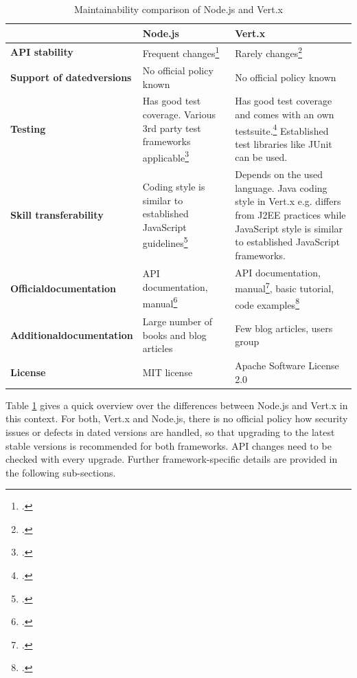 \begin{savenotes}
\begin{table}[ht]
\begin{tabular*}{\textwidth}{p{} p{} p{}}
\toprule
				& \textbf{Node.js} & \textbf{Vert.x} \\
\midrule 
\textbf{API stability}
& Frequent changes\footcite[Cf.][]{node_api_changes_2012}
& Rarely changes\footcite[Cf.][]{vertx_2012}
\\	
\textbf{Support of dated\newline versions}
& No official policy known
& No official policy known
\\
\textbf{Testing}
& Has good test coverage. Various 3rd party test frameworks applicable\footcite[Cf.][]{node_testing_2013}
& Has good test coverage and comes with an own testsuite.\footcite[Cf.][]{vertx_repository_2013} Established test libraries like JUnit can be used.
\\						  
\textbf{Skill transferability}	
& Coding style is similar to established JavaScript guidelines\footcite[Cf.][]{node_style_2012}							
& Depends on the used language. Java coding style in Vert.x e.g. differs from J2EE practices
\nomenclature{J2EE}{Java 2 Enterprise  Edition} while JavaScript style
is similar to established JavaScript frameworks.
\\
\textbf{Official\newline documentation}
& API documentation, manual\footcite[Cf.][]{node_2012}
& API documentation, manual\footcite[Cf.][]{vertx_2012}, basic tutorial, code examples\footcite[Cf.][]{Fox_2013}
\\
\textbf{Additional\newline documentation}
& Large number of books and blog articles
& Few blog articles, users group
\\
\textbf{License}			
& MIT license 			
& Apache Software License 2.0
 \\
\bottomrule 
\end{tabular*}
  \caption{Maintainability comparison of Node.js and Vert.x}
  \label{tbl_maintain}
\end{table}
\end{savenotes}

Table \ref{tbl_maintain} gives a quick overview over the differences between
Node.js and Vert.x in this context. For both, Vert.x and Node.js, there is no
official policy how security issues or defects in dated versions are handled, so
that upgrading to the latest stable versions is recommended for both frameworks.
API changes need to be checked with every upgrade.
Further framework-specific details are provided in the following sub-sections.\\


